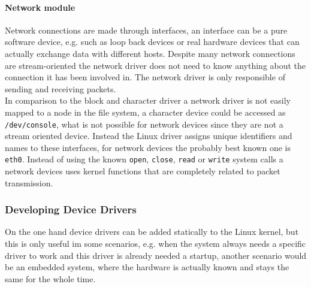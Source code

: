 \documentclass{sig-alternate-05-2015}
\begin{document}
\paragraph{Network module}
Network connections are made through interfaces, an interface can be a pure software device, e.g. such as loop back devices or real hardware devices that can actually exchange data with different hosts. Despite many network connections are stream-oriented the network driver does not need to know anything about the connection it has been involved in. The network driver is only responsible of sending and receiving packets. \\
In comparison to the block and character driver a network driver is not easily mapped to a node in the file system, a character device could be accessed as \texttt{/dev/console}, what is not possible for network devices since they are not a stream oriented device. Instead the Linux driver assigns unique identifiers and names to these interfaces, for network devices the probably best known one is \texttt{eth0}. Instead of using the known \texttt{open}, \texttt{close}, \texttt{read} or \texttt{write} system calls a network devices uses kernel functions that are completely related to packet transmission. 

\subsubsection{Developing Device Drivers}
On the one hand device drivers can be added statically to the Linux kernel, but this is only useful im some scenarios, e.g. when the system always needs a specific driver to work and this driver is already needed a startup, another scenario would be an embedded system, where the hardware is actually known and stays the same for the whole time. \cite{Corbet:2005:LDD:1209083} \\
\end{document}
